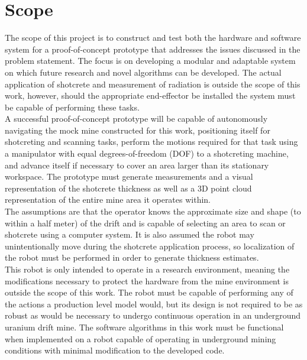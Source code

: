 \section{Scope}
\label{sec:scope}

The scope of this project is to construct and test both the hardware and software system for a proof-of-concept prototype that addresses the issues discussed in the problem statement. The focus is on developing a modular and adaptable system on which future research and novel algorithms can be developed. The actual application of shotcrete and measurement of radiation is outside the scope of this work, however, should the appropriate end-effector be installed the system must be capable of performing these tasks.\\

A successful proof-of-concept prototype will be capable of autonomously navigating the mock mine constructed for this work, positioning itself for shotcreting and scanning tasks, perform the motions required for that task using a manipulator with equal degrees-of-freedom (DOF) to a shotcreting machine, and advance itself if necessary to cover an area larger than its stationary workspace. The prototype must generate measurements and a visual representation of the shotcrete thickness as well as a 3D point cloud representation of the entire mine area it operates within.\\

The assumptions are that the operator knows the approximate size and shape (to within a half meter) of the drift and is capable of selecting an area to scan or shotcrete using a computer system. It is also assumed the robot may unintentionally move during the shotcrete application process, so localization of the robot must be performed in order to generate thickness estimates.\\

This robot is only intended to operate in a research environment, meaning the modifications necessary to protect the hardware from the mine environment is outside the scope of this work. The robot must be capable of performing any of the actions a production level model would, but its design is not required to be as robust as would be necessary to undergo continuous operation in an underground uranium drift mine. The software algorithms in this work must be functional when implemented on a robot capable of operating in underground mining conditions with minimal modification to the developed code.\\

